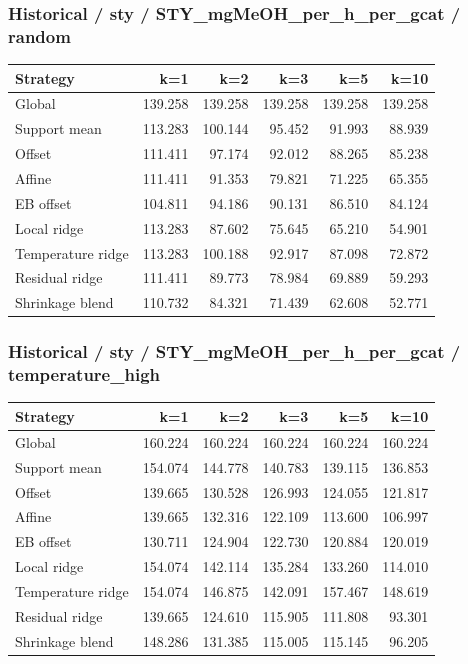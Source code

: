 \subsubsection*{Historical / sty / STY\_mgMeOH\_per\_h\_per\_gcat / random}
\begin{center}\small
\begin{tabular}{lrrrrr}
\toprule
Strategy & k=1 & k=2 & k=3 & k=5 & k=10 \\
\midrule
Global & 139.258 & 139.258 & 139.258 & 139.258 & 139.258 \\
Support mean & 113.283 & 100.144 & 95.452 & 91.993 & 88.939 \\
Offset & 111.411 & 97.174 & 92.012 & 88.265 & 85.238 \\
Affine & 111.411 & 91.353 & 79.821 & 71.225 & 65.355 \\
EB offset & 104.811 & 94.186 & 90.131 & 86.510 & 84.124 \\
Local ridge & 113.283 & 87.602 & 75.645 & 65.210 & 54.901 \\
Temperature ridge & 113.283 & 100.188 & 92.917 & 87.098 & 72.872 \\
Residual ridge & 111.411 & 89.773 & 78.984 & 69.889 & 59.293 \\
Shrinkage blend & 110.732 & 84.321 & 71.439 & 62.608 & 52.771 \\
\bottomrule
\end{tabular}
\end{center}

\subsubsection*{Historical / sty / STY\_mgMeOH\_per\_h\_per\_gcat / temperature\_high}
\begin{center}\small
\begin{tabular}{lrrrrr}
\toprule
Strategy & k=1 & k=2 & k=3 & k=5 & k=10 \\
\midrule
Global & 160.224 & 160.224 & 160.224 & 160.224 & 160.224 \\
Support mean & 154.074 & 144.778 & 140.783 & 139.115 & 136.853 \\
Offset & 139.665 & 130.528 & 126.993 & 124.055 & 121.817 \\
Affine & 139.665 & 132.316 & 122.109 & 113.600 & 106.997 \\
EB offset & 130.711 & 124.904 & 122.730 & 120.884 & 120.019 \\
Local ridge & 154.074 & 142.114 & 135.284 & 133.260 & 114.010 \\
Temperature ridge & 154.074 & 146.875 & 142.091 & 157.467 & 148.619 \\
Residual ridge & 139.665 & 124.610 & 115.905 & 111.808 & 93.301 \\
Shrinkage blend & 148.286 & 131.385 & 115.005 & 115.145 & 96.205 \\
\bottomrule
\end{tabular}
\end{center}

